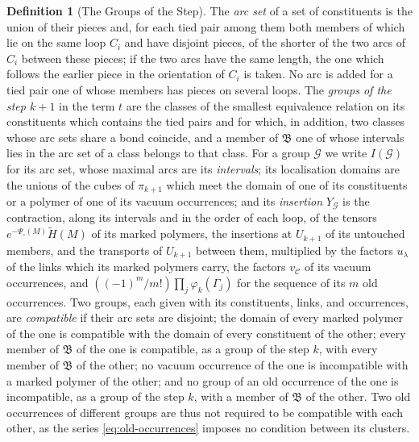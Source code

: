\documentclass[11pt]{preprint}
\numberwithin{equation}{section}
\theoremstyle{definition}
\newtheorem{definition}[theorem]{Definition}
\theoremstyle{remark}
\theoremstyle{plain}
\begin{document}
\begin{definition}[The Groups of the Step]
The \emph{arc set} of a set of constituents is the union of their pieces and, for each tied pair among them both members of which lie on the same loop $C_i$ and have disjoint pieces, of the shorter of the two arcs of $C_i$ between these pieces; if the two arcs have the same length, the one which follows the earlier piece in the orientation of $C_i$ is taken. No arc is added for a tied pair one of whose members has pieces on several loops. The \emph{groups of the step $k + 1$} in the term $t$ are the classes of the smallest equivalence relation on its constituents which contains the tied pairs and for which, in addition, two classes whose arc sets share a bond coincide, and a member of $\mathfrak B$ one of whose intervals lies in the arc set of a class belongs to that class. For a group $\mathcal G$ we write $I(\mathcal G)$ for its arc set, whose maximal arcs are its \emph{intervals}; its localisation domains are the unions of the cubes of $\pi_{k+1}$ which meet the domain of one of its constituents or a polymer of one of its vacuum occurrences; and its \emph{insertion} $Y_{\mathcal G}$ is the contraction, along its intervals and in the order of each loop, of the tensors $e^{-\Psi_\circ(M)}\tilde H(M)$ of its marked polymers, the insertions at $U_{k+1}$ of its untouched members, and the transports of $U_{k+1}$ between them, multiplied by the factors $u_\lambda$ of the links which its marked polymers carry, the factors $v_{\mathcal C}$ of its vacuum occurrences, and $((-1)^m/m!)\prod_j\varphi_k(\Gamma_j)$ for the sequence of its $m$ old occurrences. Two groups, each given with its constituents, links, and occurrences, are \emph{compatible} if their arc sets are disjoint; the domain of every marked polymer of the one is compatible with the domain of every constituent of the other; every member of $\mathfrak B$ of the one is compatible, as a group of the step $k$, with every member of $\mathfrak B$ of the other; no vacuum occurrence of the one is incompatible with a marked polymer of the other; and no group of an old occurrence of the one is incompatible, as a group of the step $k$, with a member of $\mathfrak B$ of the other. Two old occurrences of different groups are thus not required to be compatible with each other, as the series \eqref{eq:old-occurrences} imposes no condition between its clusters.
\end{definition}
\end{document}
